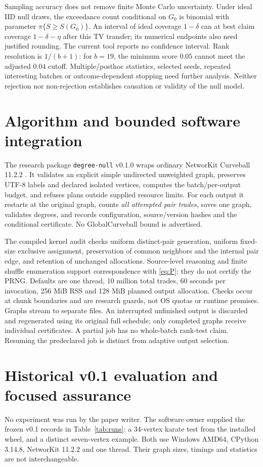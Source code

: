 \documentclass[11pt]{article}
\begin{document}
Sampling accuracy does not remove finite Monte Carlo uncertainty. Under ideal IID null draws, the exceedance count conditional on $G_0$ is binomial with parameter $\pi\{S\ge S(G_0)\}$. An interval of ideal coverage $1-\delta$ can at best claim coverage $1-\delta-\eta$ after this TV transfer; its numerical endpoints also need justified rounding. The current tool reports no confidence interval. Rank resolution is $1/(b+1)$: for $b=19$, the minimum score $0.05$ cannot meet the adjusted $0.04$ cutoff. Multiple/posthoc statistics, selected seeds, repeated interesting batches or outcome-dependent stopping need further analysis. Neither rejection nor non-rejection establishes causation or validity of the null model.

\section{Algorithm and bounded software integration}
The research package \texttt{degree-null} v0.1.0 wraps ordinary NetworKit Curveball 11.2.2 \cite{NK}. It validates an explicit simple undirected unweighted graph, preserves UTF-8 labels and declared isolated vertices, computes the batch/per-output budget, and refuses plans outside supplied resource limits. For each output it restarts at the original graph, counts \emph{all attempted pair trades}, saves one graph, validates degrees, and records configuration, source/version hashes and the conditional certificate. No GlobalCurveball bound is advertised.

The compiled kernel audit checks uniform distinct-pair generation, uniform fixed-size exclusive assignment, preservation of common neighbors and the internal pair edge, and retention of unchanged allocations. Source-level reasoning and finite shuffle enumeration support correspondence with \eqref{eq:P}; they do not certify the PRNG. Defaults are one thread, 10 million total trades, 60 seconds per invocation, 256 MiB RSS and 128 MiB planned output allocation. Checks occur at chunk boundaries and are research guards, not OS quotas or runtime promises. Graphs stream to separate files. An interrupted unfinished output is discarded and regenerated using its original full schedule; only completed graphs receive individual certificates. A partial job has no whole-batch rank-test claim. Resuming the predeclared job is distinct from adaptive output selection.

\section{Historical v0.1 evaluation and focused assurance}
No experiment was run by the paper writer. The software owner supplied the frozen v0.1 records in Table~\ref{tab:runs}: a 34-vertex karate test from the installed wheel, and a distinct seven-vertex example. Both use Windows AMD64, CPython 3.14.8, NetworKit 11.2.2 and one thread. Their graph sizes, timings and statistics are not interchangeable.
\end{document}
